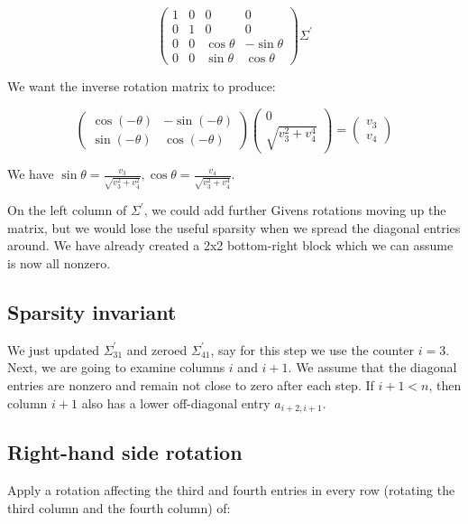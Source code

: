 \documentclass{article}
\begin{document}
$$
\left(\begin{matrix}
    1 & 0 & 0 & 0
    \\
    0 & 1 & 0 & 0
    \\
    0 & 0 & \cos\theta & -\sin\theta
    \\
    0 & 0 & \sin\theta & \cos\theta
\end{matrix}\right)
\Sigma^\prime
$$

We want the inverse rotation matrix to produce:

$$
\left(\begin{matrix}
    \cos(-\theta) & -\sin(-\theta) \\
    \sin(-\theta) & \cos(-\theta)
\end{matrix}\right)
\left(\begin{matrix} 0 \\ \sqrt{v_3^2 + v_4^4} \end{matrix}\right)
=
\left(\begin{matrix} v_3 \\ v_4 \end{matrix}\right)
$$

We have $\sin\theta = \frac{v_3}{\sqrt{v_3^2 + v_4^2}}, \cos\theta = \frac{v_4}{\sqrt{v_3^2 + v_4^4}}$.

On the left column of $\Sigma^\prime$, we could add further Givens rotations moving up the matrix, but we would lose the useful sparsity when we spread the diagonal entries around. We have already created a 2x2 bottom-right block which we can assume is now all nonzero.

\subsection{Sparsity invariant}

We just updated $\Sigma^\prime_{31}$ and zeroed $\Sigma^\prime_{41}$, say for this step we use the counter $i = 3$. Next, we are going to examine columns $i$ and $i+1$. We assume that the diagonal entries are nonzero and remain not close to zero after each step. If $i+1 < n$, then column $i+1$ also has a lower off-diagonal entry $a_{i+2,i+1}$.

\subsection{Right-hand side rotation}

Apply a rotation affecting the third and fourth entries in every row (rotating the third column and the fourth column) of:
\end{document}
